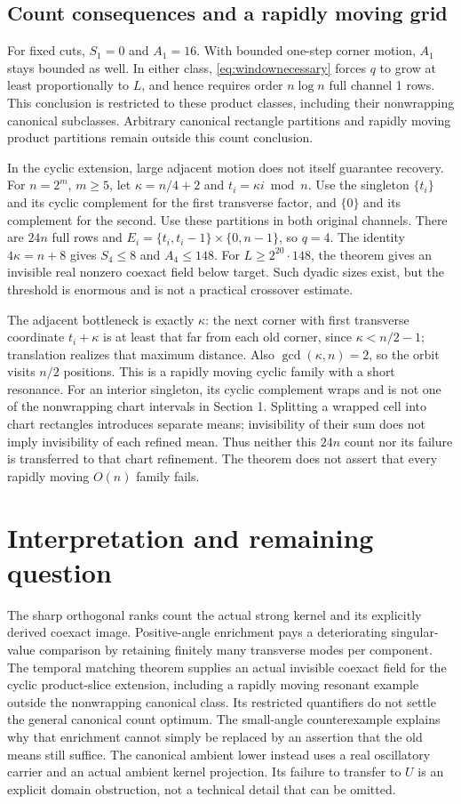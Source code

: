 \documentclass[11pt,a4paper]{article}
\begin{document}
\subsection{Count consequences and a rapidly moving grid}
For fixed cuts, $S_1=0$ and $A_1=16$. With bounded one-step corner
motion, $A_1$ stays bounded as well. In either class,
\eqref{eq:windownecessary} forces $q$ to grow at least proportionally to
$L$, and hence requires order $n\log n$ full channel 1 rows. This conclusion
is restricted to these product classes, including their nonwrapping
canonical subclasses. Arbitrary canonical rectangle partitions and
rapidly moving product partitions remain outside this count conclusion.

In the cyclic extension, large adjacent motion does not itself guarantee
recovery. For
$n=2^m$, $m\geq5$, let $\kappa=n/4+2$ and $t_i=\kappa i\bmod n$.
Use the singleton $\{t_i\}$ and its cyclic complement for the first
transverse factor, and $\{0\}$ and its complement for the second.
Use these partitions in both original channels. There are $24n$ full rows
and $E_i=\{t_i,t_i-1\}\times\{0,n-1\}$, so $q=4$.
The identity $4\kappa=n+8$ gives $S_4\leq8$ and $A_4\leq148$.
For $L\geq2^{20}\cdot148$, the theorem gives an invisible real nonzero
coexact field below target. Such dyadic sizes exist, but the threshold is
enormous and is not a practical crossover estimate.

The adjacent bottleneck is exactly $\kappa$: the next corner with first
transverse coordinate $t_i+\kappa$ is at least that far from each old
corner, since $\kappa<n/2-1$; translation realizes that maximum distance.
Also $\gcd(\kappa,n)=2$, so the orbit visits $n/2$ positions.
This is a rapidly moving cyclic family with a short resonance. For an
interior singleton, its cyclic complement wraps and is not one of the
nonwrapping chart intervals in Section 1. Splitting a wrapped cell into
chart rectangles introduces separate means; invisibility of their sum
does not imply invisibility of each refined mean. Thus neither this
$24n$ count nor its failure is transferred to that chart refinement.
The theorem does not assert that every rapidly moving $O(n)$ family fails.


\section{Interpretation and remaining question}
The sharp orthogonal ranks count the actual strong kernel and its explicitly
derived coexact image. Positive-angle enrichment pays a deteriorating
singular-value comparison by retaining finitely many transverse modes per
component. The temporal matching theorem supplies an actual invisible coexact field
for the cyclic product-slice extension, including a rapidly moving
resonant example outside the nonwrapping canonical class. Its restricted quantifiers do not settle the general canonical
count optimum. The small-angle counterexample explains why that enrichment cannot
simply be replaced by an assertion that the old means still suffice.
The canonical ambient lower instead uses a real oscillatory carrier and an
actual ambient kernel projection. Its failure to transfer to $U$ is an
explicit domain obstruction, not a technical detail that can be omitted.
\end{document}
